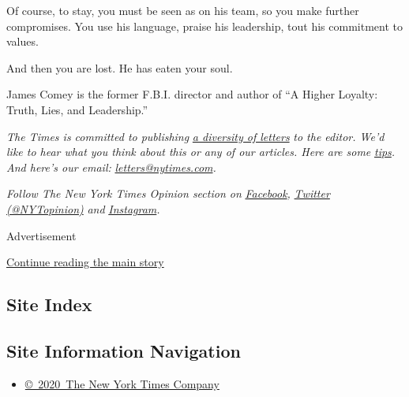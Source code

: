 Of course, to stay, you must be seen as on his team, so you make further
compromises. You use his language, praise his leadership, tout his
commitment to values.

And then you are lost. He has eaten your soul.

James Comey is the former F.B.I. director and author of ``A Higher
Loyalty: Truth, Lies, and Leadership.''

\emph{The Times is committed to publishing}
\href{https://www.nytimes.com/2019/01/31/opinion/letters/letters-to-editor-new-york-times-women.html}{\emph{a
diversity of letters}} \emph{to the editor. We'd like to hear what you
think about this or any of our articles. Here are some}
\href{https://help.nytimes.com/hc/en-us/articles/115014925288-How-to-submit-a-letter-to-the-editor}{\emph{tips}}\emph{.
And here's our email:}
\href{mailto:letters@nytimes.com}{\emph{letters@nytimes.com}}\emph{.}

\emph{Follow The New York Times Opinion section on}
\href{https://www.facebook.com/nytopinion}{\emph{Facebook}}\emph{,}
\href{http://twitter.com/NYTOpinion}{\emph{Twitter (@NYTopinion)}}
\emph{and}
\href{https://www.instagram.com/nytopinion/}{\emph{Instagram}}\emph{.}

Advertisement

\protect\hyperlink{after-bottom}{Continue reading the main story}

\hypertarget{site-index}{%
\subsection{Site Index}\label{site-index}}

\hypertarget{site-information-navigation}{%
\subsection{Site Information
Navigation}\label{site-information-navigation}}

\begin{itemize}
\tightlist
\item
  \href{https://help.nytimes.com/hc/en-us/articles/115014792127-Copyright-notice}{©~2020~The
  New York Times Company}
\end{itemize}

